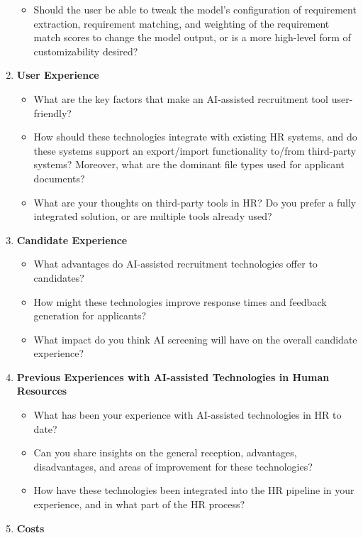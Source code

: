 \documentclass[draft,final]{thesisclass} %
\begin{document}
\begin{enumerate}
\begin{itemize}
        \item Should the user be able to tweak the model's configuration of requirement extraction, requirement matching, and weighting of the requirement match scores to change the model output, or is a more high-level form of customizability desired?
    \end{itemize}
    \item \textbf{User Experience}
    \begin{itemize}
        \item What are the key factors that make an \acs{AI}-assisted recruitment tool user-friendly?
        \item How should these technologies integrate with existing \acs{HR} systems, and do these systems support an export/import functionality to/from third-party systems? Moreover, what are the dominant file types used for applicant documents?
        \item What are your thoughts on third-party tools in HR? Do you prefer a fully integrated solution, or are multiple tools already used?
    \end{itemize}
    \item \textbf{Candidate Experience}
    \begin{itemize}
        \item What advantages do \acs{AI}-assisted recruitment technologies offer to candidates?
        \item How might these technologies improve response times and feedback generation for applicants?
        \item What impact do you think \acs{AI} screening will have on the overall candidate experience?
    \end{itemize}
    \item \textbf{Previous Experiences with \acs{AI}-assisted Technologies in Human Resources}
    \begin{itemize}
        \item What has been your experience with \acs{AI}-assisted technologies in \acs{HR} to date?
        \item Can you share insights on the general reception, advantages, disadvantages, and areas of improvement for these technologies?
        \item How have these technologies been integrated into the \acs{HR} pipeline in your experience, and in what part of the \acs{HR} process?
    \end{itemize}
    \item \textbf{Costs}

\end{enumerate}
\end{document}
